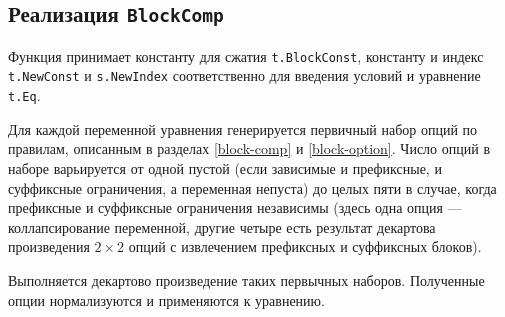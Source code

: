 \documentclass[12pt]{article}
\begin{document}
\subsection{Реализация \texttt{BlockComp}}

Функция принимает константу для сжатия \texttt{t.BlockConst}, константу
и индекс \texttt{t.NewConst} и \texttt{s.NewIndex} соответственно для введения
условий и уравнение \texttt{t.Eq}.

Для каждой переменной уравнения генерируется первичный набор опций по правилам,
описанным в разделах \ref{block-comp} и \ref{block-option}. Число опций в
наборе варьируется от одной пустой (если зависимые и префиксные, и суффиксные
ограничения, а переменная непуста) до целых пяти в случае, когда
префиксные и суффиксные ограничения независимы (здесь одна опция ---
коллапсирование переменной, другие четыре есть результат декартова произведения
$2 \times 2$ опций с извлечением префиксных и суффиксных блоков).

Выполняется декартово произведение таких первычных наборов. Полученные опции
нормализуются и применяются к уравнению.

\end{document}
